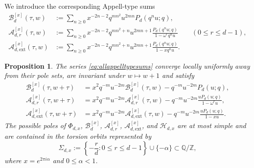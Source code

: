 \documentclass[12pt]{amsart}
\numberwithin{equation}{section}
\newtheorem{proposition}[theorem]{Proposition}
\newcommand{\QQ}{\mathbb Q}
\newcommand{\ZZ}{\mathbb Z}
\begin{document}
We introduce the corresponding Appell-type sums
\begin{align}\label{eq:allappelltypesums}
\mathcal B_d^{[x]}(\tau,w)
&:=
\sum_{n\geq 0} x^{-2n-2}q^{mn^2}u^{2mn}P_d(q^nu;q),\\
\mathcal A_{d,r}^{[x]}(\tau,w)
&:=
\sum_{n\geq 0}
x^{-2n-2}q^{mn^2+n}u^{2mn+1}
\frac{P_d(q^n u;q)}{1-\omega^r q^n u}
\qquad (0\le r\le d-1),\\
\mathcal A_{d,\mathrm{ext}}^{[x]}(\tau,w)
&:=
\sum_{n\geq 0}
x^{-2n-2}q^{mn^2+n}u^{2mn+1}
\frac{P_d(q^n u;q)}{1-xq^n u}.
\end{align}
\begin{proposition}\label{prop:allappelltypesums}
    The series \eqref{eq:allappelltypesums} converge locally uniformly away from their pole sets, are invariant under $w\mapsto w+1$ and satisfy
\begin{align*}
\mathcal B_d^{[x]}(\tau,w+\tau)
&=
x^2q^{-m}u^{-2m}\mathcal B_d^{[x]}(\tau,w)-q^{-m}u^{-2m}P_d(u;q),\\
\mathcal A_{d,r}^{[x]}(\tau,w+\tau)
&=
x^2q^{-m}u^{-2m}\mathcal A_{d,r}^{[x]}(\tau,w)-q^{-m}u^{-2m}\frac{uP_d(u;q)}{1-\omega^ru},\\
\mathcal A_{d,\mathrm{ext}}^{[x]}(\tau,w+\tau)
&=
x^2q^{-m}u^{-2m}\mathcal A_{d,\mathrm{ext}}^{[x]}(\tau,w)-q^{-m}u^{-2m}\frac{uP_d(u;q)}{1-xu}.
\end{align*}
The possible poles of $\Phi_{d,x}$, $\mathcal B_d^{[x]}$, $\mathcal A_{d,r}^{[x]}$, $\mathcal A_{d,\mathrm{ext}}^{[x]}$, and $\mathcal H_{d,x}$ are at most simple and are contained in the torsion orbits represented by
\[
\Sigma_{d,x}:=\left\{-\frac{r}{d}:0\leq r\leq d-1\right\}\cup\{-\alpha\}
\subset \QQ/\ZZ,
\]
where $x=e^{2\pi i\alpha}$ and $0\leq \alpha<1$.

\end{proposition}
\end{document}
